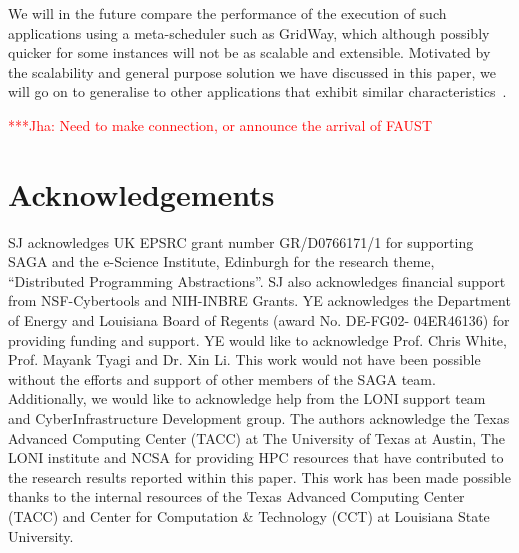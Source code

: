 \documentclass[conference,final]{IEEEtran}
\newcommand{\jhanote}[1]{ {\textcolor{red} { ***Jha: #1 }}}
\newcommand{\jhanote}[1]{}
\begin{document}
We will in the future compare the performance of the execution of such
applications using a meta-scheduler such as GridWay, which although
possibly quicker for some instances will not be as scalable and
extensible. Motivated by the scalability and general purpose solution
we have discussed in this paper, we will go on to generalise to other
applications that exhibit similar characteristics~\cite{nature99}.

\jhanote{Need to make connection, or announce the arrival of FAUST}









\section{Acknowledgements}
SJ acknowledges UK EPSRC grant number GR/D0766171/1 for supporting
SAGA and the e-Science Institute, Edinburgh for the research theme,
``Distributed Programming Abstractions''.  SJ also acknowledges
financial support from NSF-Cybertools and NIH-INBRE Grants. YE
acknowledges the Department of Energy and Louisiana Board of 
Regents (award No. DE-FG02- 04ER46136) for providing funding 
and support. YE would like to acknowledge Prof. Chris White,
Prof. Mayank Tyagi and Dr. Xin Li. This work would not have 
been possible without the efforts and support of other
members of the SAGA team. Additionally, we would like to acknowledge
help from the LONI support team and CyberInfrastructure Development
group. The authors acknowledge the Texas
Advanced Computing Center (TACC) at The University of Texas at Austin,
The LONI institute and NCSA for providing HPC resources that have
contributed to the research results reported within this paper. This
work has been made possible thanks to the internal resources of the
Texas Advanced Computing Center (TACC) and 
Center for Computation \& Technology (CCT) at Louisiana State University.

 

\end{document}
